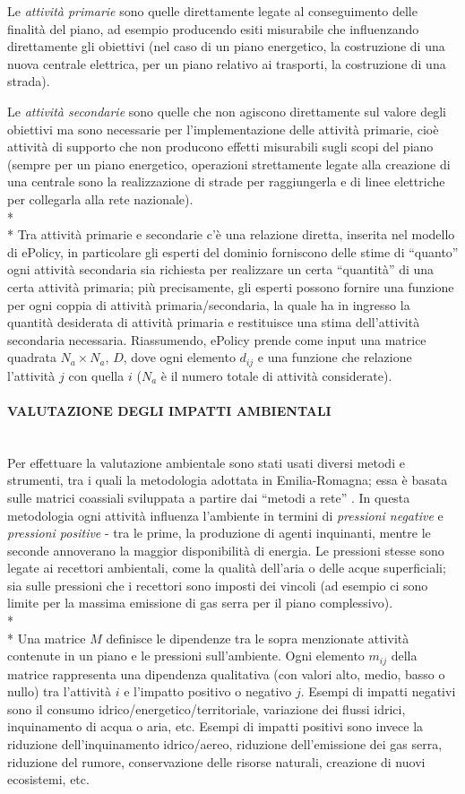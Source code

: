\documentclass[12pt,a4paper,openright,twoside]{report}
\newcommand{\myparagraph}[1]{\paragraph{#1}\mbox{}\\}
\begin{document}
Le \emph{attività primarie} sono quelle direttamente legate al conseguimento delle finalità del piano, ad esempio producendo esiti misurabile che influenzando direttamente gli obiettivi (nel caso di un piano energetico, la costruzione di una nuova centrale elettrica, per un piano relativo ai trasporti, la costruzione di una strada).

Le \emph{attività secondarie} sono quelle che non agiscono direttamente sul valore degli obiettivi ma sono necessarie per l'implementazione delle attività primarie, cioè attività di supporto che non producono effetti misurabili sugli scopi del piano (sempre per un piano energetico, operazioni strettamente legate alla creazione di una centrale sono la realizzazione di strade per raggiungerla e di linee elettriche per collegarla alla rete nazionale).\\*\\*
Tra attività primarie e secondarie c'è una relazione diretta, inserita nel modello di ePolicy, in particolare gli esperti del dominio forniscono delle stime di ``quanto'' ogni attività secondaria sia richiesta per realizzare un  certa ``quantità'' di una certa attività primaria; più precisamente, gli esperti possono fornire una funzione per ogni coppia di attività primaria/secondaria, la quale ha in ingresso la quantità desiderata di attività primaria e restituisce una stima dell'attività secondaria necessaria. Riassumendo, ePolicy prende come input una matrice quadrata $N_a \times N_a$, $D$, dove ogni elemento $d_{ij}$ e una funzione che relazione l'attività $j$ con quella $i$ ($N_a$ è il numero totale di attività considerate).

\myparagraph{VALUTAZIONE DEGLI IMPATTI AMBIENTALI}
Per effettuare la valutazione ambientale sono stati usati diversi metodi e strumenti, tra i quali la metodologia adottata in Emilia-Romagna; essa è basata sulle matrici coassiali \cite{coaxMatr} sviluppata a partire dai ``metodi a rete'' \cite{networkMethod}. In questa metodologia ogni attività influenza l'ambiente  in termini di \emph{pressioni negative} e \emph{pressioni positive} - tra le prime, la produzione di agenti inquinanti, mentre le seconde annoverano la maggior disponibilità di energia. Le pressioni stesse sono legate ai recettori ambientali, come la qualità dell'aria o delle acque superficiali; sia sulle pressioni che i recettori sono imposti dei vincoli (ad esempio ci sono limite per la massima emissione di gas serra per il piano complessivo).\\*\\*
Una matrice $M$ definisce le dipendenze tra le sopra menzionate attività contenute in un piano e le pressioni sull'ambiente. Ogni elemento $m_{ij}$ della matrice rappresenta una dipendenza qualitativa (con valori alto, medio, basso o nullo) tra l'attività $i$ e l'impatto positivo o negativo $j$. Esempi di impatti negativi sono il consumo idrico/energetico/territoriale, variazione dei flussi idrici, inquinamento di acqua o aria, etc. Esempi di impatti positivi sono invece la riduzione dell'inquinamento idrico/aereo, riduzione dell'emissione dei gas serra, riduzione del rumore, conservazione delle risorse naturali, creazione di nuovi ecosistemi, etc.
\end{document}
